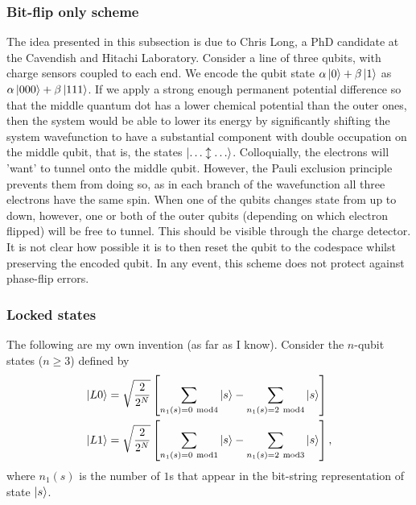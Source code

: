 \documentclass{report}
\begin{document}
\begin{appendices}
\subsubsection{Bit-flip only scheme}
The idea presented in this subsection is due to Chris Long, a PhD candidate at the Cavendish and Hitachi Laboratory.
Consider a line of three qubits, with charge sensors coupled to each end. We encode the qubit state $\alpha \ket{0} + \beta\ket{1}$ as $\alpha \ket{000} + \beta\ket{111}$. If we apply a strong enough permanent potential difference so that the middle quantum dot has a lower chemical potential than the outer ones, then the system would be able to lower its energy by significantly shifting the system wavefunction to have a substantial component with double occupation on the middle qubit, that is, the states $\ket{\dots \updownarrow \dots}$. Colloquially, the electrons will 'want' to tunnel onto the middle qubit. However, the Pauli exclusion principle prevents them from doing so, as in each branch of the wavefunction all three electrons have the same spin. When one of the qubits changes state from up to down, however, one or both of the outer qubits (depending on which electron flipped) will be free to tunnel. This should be visible through the charge detector. It is not clear how possible it is to then reset the qubit to the codespace whilst preserving the encoded qubit. In any event, this scheme does not protect against phase-flip errors.
\subsubsection{Locked states}
The following are my own invention (as far as I know). Consider the $n$-qubit states ($n \ge 3$) defined by
\begin{align*}
    \ket{L0} &= \sqrt{\frac{2}{2^N}}\left[\sum_{n_1(s) = 0\mathrm{\ mod}4}{\ket{s}} - \sum_{n_1(s) = 2\mathrm{\ mod}4}{\ket{s}}\right] \\
    \ket{L1} &= \sqrt{\frac{2}{2^N}}\left[\sum_{n_1(s) = 0\mathrm{\ mod}1}{\ket{s}} - \sum_{n_1(s) = 2\mathrm{\ mod}3}{\ket{s}}\right],
\end{align*} where $n_1(s)$ is the number of $1$s that appear in the bit-string representation of state $\ket{s}$.


\end{appendices}
\end{document}

